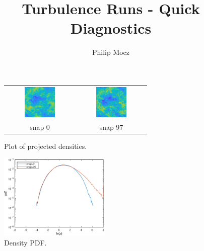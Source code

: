 \documentclass{article}
\title{Turbulence Runs - Quick Diagnostics}
\author{Philip Mocz}
\begin{document}
\maketitle


\begin{figure}[ht]
\centering
\begin{tabular}{cc}
\includegraphics[width=0.47\textwidth]{snap0.png}  & 
\includegraphics[width=0.47\textwidth]{snap95.png}  \\
snap 0 & snap 97
\end{tabular}
\caption{Plot of projected densities.}
\end{figure}


\begin{figure}[ht]
\centering
\includegraphics[width=0.47\textwidth]{densitypdf.eps} 
\caption{Density PDF.}
\end{figure}
\end{document}

